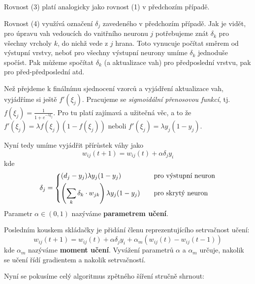 \documentclass[11pt]{report} %
\begin{document}
Rovnost (3) platí analogicky jako rovnost (1) v předchozím případě.

Rovnost (4) využívá označení $\delta_j$ zavedeného v předchozím případě. Jak je vidět, pro úpravu vah vedoucích do vnitřního neuronu $j$ potřebujeme znát $\delta_k$ pro všechny vrcholy $k$, do nichž vede z $j$ hrana. Toto vynucuje počítat směrem od výstupní vrstvy, neboť pro všechny výstupní neurony umíme $\delta_k$ jednoduše spočíst. Pak můžeme spočítat $\delta_k$ (a aktualizace vah) pro předposlední vrstvu, pak pro před-předposlední atd.

Než přejdeme k finálnímu sjednocení vzorců a vyjádření aktualizace vah, vyjádříme si ještě $f'(\xi_j)$. Pracujeme se \textit{sigmoidální přenosovou funkcí}, tj. $f(\xi_j) = \frac{1}{1 + e^{-\lambda\xi_j}}$. Pro tu platí zajímavá a užitečná věc, a to že $f'(\xi_j) = \lambda f(\xi_j)(1 - f(\xi_j))$ neboli $f'(\xi_j) = \lambda y_j(1 - y_j)$.

Nyní tedy umíme vyjádřit přírůstek váhy jako
$$
w_{ij}(t+1) = w_{ij}(t) + \alpha\delta_jy_i
$$
kde
$$
\delta_j =
\begin{dcases*}
(d_j - y_j)\lambda y_j (1-y_j) 	& \quad pro výstupní neuron\\
\left(\sum\limits_k \delta_k\cdot w_{jk} \right) \lambda y_j (1-y_j)  	& \quad pro skrytý neuron\\
\end{dcases*}
$$
Parametr $\alpha \in (0,1)$ nazýváme \textbf{parametrem učení}.

Posledním kouskem skládačky je přidání členu reprezentujícího setrvačnost učení:
$$
w_{ij}(t+1) = w_{ij}(t) + \alpha\delta_jy_i + \alpha_m(w_{ij}(t) - w_{ij}(t-1))
$$
kde $\alpha_m$ nazýváme \textbf{moment učení}. Vyvážení parametrů $\alpha$ a $\alpha_m$ určuje, nakolik se učení řídí gradientem a nakolik setrvačností.

Nyní se pokusíme celý algoritmus zpětného šíření stručně shrnout:
\end{document}
